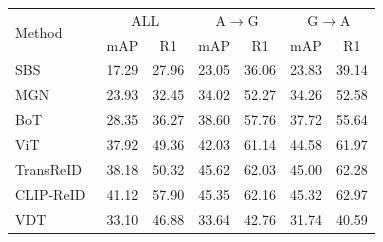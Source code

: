 \documentclass[runningheads]{llncs}
\makeatletter
\let\leaderboards@table\table
\let\leaderboards@endtable\endtable
\renewenvironment{table}[1][]{\leaderboards@table[H]}{\leaderboards@endtable}
\makeatother
\begin{document}
\begin{table}[t]
  \caption{\textbf{Performance comparison on CP2108.}
    Best results are in \textbf{bold}.}
  \label{tab:sota_cp2108}
  \centering
  \begin{tabular}{lcccccc}
    \toprule
    \multirow{2}{*}{Method}
                                       & \multicolumn{2}{c}{ALL}
                                       & \multicolumn{2}{c}{A$\rightarrow$G}
                                       & \multicolumn{2}{c}{G$\rightarrow$A}                                                                                                                                \\
    \cmidrule(lr){2-3}\cmidrule(lr){4-5}\cmidrule(lr){6-7}
                                       & \multicolumn{1}{c}{mAP}             & \multicolumn{1}{c}{R1} & \multicolumn{1}{c}{mAP} & \multicolumn{1}{c}{R1} & \multicolumn{1}{c}{mAP} & \multicolumn{1}{c}{R1} \\
    \Xhline{0.6pt}
    SBS~\cite{he2023fastreid}          & 17.29                               & 27.96                  & 23.05                   & 36.06                  & 23.83                   & 39.14                  \\
    MGN~\cite{wang2018learning}        & 23.93                               & 32.45                  & 34.02                   & 52.27                  & 34.26                   & 52.58                  \\
    BoT~\cite{luo2019bag}              & 28.35                               & 36.27                  & 38.60                   & 57.76                  & 37.72                   & 55.64                  \\
    \Xhline{0.6pt}
    ViT~\cite{dosovitskiyimage}        & 37.92                               & 49.36                  & 42.03                   & 61.14                  & 44.58                   & 61.97                  \\
    TransReID~\cite{he2021transreid}   & 38.18                               & 50.32                  & 45.62                   & 62.03                  & 45.00                   & 62.28                  \\
    CLIP-ReID~\cite{li2023clip}        & 41.12                               & 57.90                  & 45.35                   & 62.16                  & 45.32                   & 62.97                  \\
    \Xhline{0.6pt}
    VDT~\cite{zhang2024view}           & 33.10                               & 46.88                  & 33.64                   & 42.76                  & 31.74                   & 40.59                  \\

\end{tabular}
\end{table}
\end{document}
